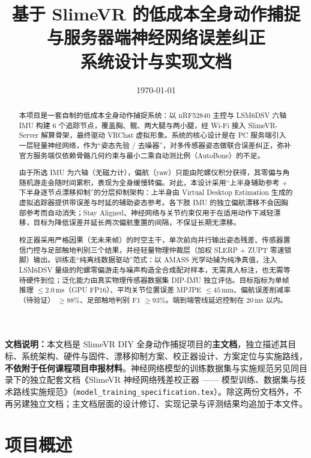 \documentclass[scheme=plain,UTF8,11pt,a4paper]{ctexart}
\title{\LARGE\bfseries 基于 SlimeVR 的低成本全身动作捕捉\\[0.3em]与服务器端神经网络误差纠正\\[0.6em]\large 系统设计与实现文档}
\date{\today}
\begin{document}
\maketitle

\begin{abstract}
本项目是一套自制的低成本全身动作捕捉系统：以 nRF52840 主控与 LSM6DSV 六轴 IMU 构建 6 个追踪节点，覆盖胸、髋、两大腿与两小腿，经 Wi-Fi 接入 SlimeVR-Server 解算骨架，最终驱动 VRChat 虚拟形象。系统的核心设计是在 PC 服务端引入一层轻量神经网络，作为“姿态先验 / 去噪器”，对多传感器姿态做联合误差纠正，弥补官方服务端仅依赖骨骼几何约束与最小二乘自动测比例（AutoBone）的不足。

由于所选 IMU 为六轴（无磁力计），偏航（yaw）只能由陀螺仪积分获得，其零偏与角随机游走会随时间累积，表现为全身缓慢转偏。对此，本设计采用“上半身辅助参考 + 下半身逐节点漂移抑制”的分层抑制架构：上半身由 Virtual Desktop Estimation 生成的虚拟追踪器提供带误差与时延的辅助姿态参考。各下肢 IMU 的独立偏航漂移不会因胸部参考而自动消失；Stay Aligned、神经网络与关节约束仅用于在适用动作下减轻漂移，目标为降低误差并延长两次偏航重置的间隔，不保证长期无漂移。

校正器采用严格因果（无未来帧）的时空主干，单次前向并行输出姿态残差、传感器置信门控与足部触地判别三个结果，并经轻量物理仲裁层（加权 SLERP + ZUPT 零速锁脚）输出。训练走“纯离线数据驱动”范式：以 AMASS 光学动捕为纯净真值，注入 LSM6DSV 量级的陀螺零偏游走与噪声构造全合成配对样本，无需真人标注，也无需等待硬件到位；泛化能力由真实物理传感器数据集 DIP-IMU 独立评估。目标指标为单帧推理 $\le 2.0$\,ms（GPU FP16）、平均关节位置误差 MPJPE $\le 45$\,mm、偏航误差削减率（待验证） $\ge 88\%$、足部触地判别 F1 $\ge 93\%$。端到端管线延迟控制在 20\,ms 以内。
\end{abstract}

\noindent\textbf{文档说明：}本文档是 SlimeVR DIY 全身动作捕捉项目的\textbf{主文档}，独立描述其目标、系统架构、硬件与固件、漂移抑制方案、校正器设计、方案定位与实施路线，\textbf{不依附于任何课程项目申报材料}。神经网络模型的训练数据集与实施规范另见同目录下的独立配套文档《SlimeVR 神经网络残差校正器 —— 模型训练、数据集与技术路线实施规范》（\texttt{model\_training\_specification.tex}）。除这两份文档外，不再另建独立文档；主文档层面的设计修订、实现记录与评测结果均追加于本文件。

\newpage
\tableofcontents
\newpage

\section{项目概述}
\label{sec:overview}
\end{document}

